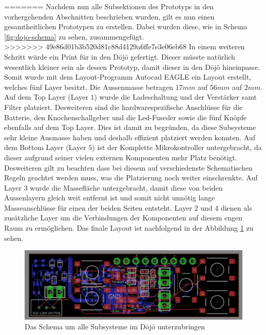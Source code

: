 =======
Nachdem nun alle Subsektionen des Prototyps in den vorhergehenden Abschnitten beschrieben wurden, gilt es nun einen gesamtheitlichen Prototypen zu erstellen. Dabei wurden diese, wie in Schema \ref{fig:dojo-schema} zu sehen, zusammengefügt.\\
>>>>>>> 49e86d01b3b520d81c88d4129a6ffe7e3e06eb68
In einem weiteren Schritt würde ein Print für in den Dōjō gefertigt. Dieser müsste natürlich wesentlich kleiner sein als dessen Prototyp, damit dieser in den Dōjō hineinpasse. Somit wurde mit dem Layout-Programm Autocad EAGLE ein Layout erstellt, welches fünf Layer besitzt. Die Aussenmasse betragen $17mm$ auf $56mm$ auf $2mm$. Auf dem Top Layer (Layer $1$) wurde die Ladeschaltung und der Verstärker samt Filter platziert. Desweiteren sind die  hardwarespezifische Anschlüsse für die Batterie, den Knochenschallgeber und die Led-Fuseder sowie die fünf Knöpfe ebenfalls auf dem Top Layer. Dies ist damit zu begründen, da diese Subsysteme sehr kleine Ausmasse haben und deshalb effizient platziert werden konnten. Auf dem Bottom Layer (Layer $5$) ist der Komplette Mikrokontroller untergebracht, da dieser aufgrund seiner vielen externen Komponenten mehr Platz benötigt. Desweiteren gilt zu beachten dass bei diesem auf verschiedenste Schematischen Regeln geachtet werden muss, was die Platzierung noch weiter einschrenkte. Auf Layer $3$ wurde die Massefläche untergebracht, damit diese von beiden Aussenlayern gleich weit entfernt ist und somit nicht unnötig lange Masseanschlüsse für einen der beiden Seiten entsteht. Layer $2$ und $4$ dienen als zusätzliche Layer um die Verbindungen der Komponenten auf diesem engen Raum zu ermöglichen. Das finale Layout ist nachfolgend in der Abbildung \ref{fig:Dojo_layout} zu sehen.
\begin{figure}[H]
	\begin{center}
		\includegraphics[width=160mm]{data/dojo_layout.png}
		\caption[Das Schema um alle Subsysteme im Dōjō unterzubringen]{Das Schema um alle Subsysteme im Dōjō unterzubringen} %
		\label{fig:Dojo_layout}
	\end{center}
\end{figure}

